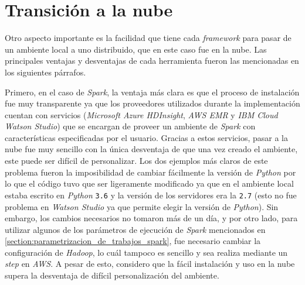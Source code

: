\section{Transición a la nube}

Otro aspecto importante es la facilidad que tiene cada \textit{framework} para pasar de un ambiente local a uno distribuido, que en este caso fue en la nube. Las principales ventajas y desventajas de cada herramienta fueron las mencionadas en los siguientes párrafos.

Primero, en el caso de \textit{Spark}, la ventaja más clara es que el proceso de instalación fue muy transparente ya que los proveedores utilizados durante la implementación cuentan con servicios (\textit{Microsoft Azure HDInsight}, \textit{AWS EMR} y \textit{IBM Cloud Watson Studio}) que se encargan de proveer un ambiente de \textit{Spark} con características especificadas por el usuario. Gracias a estos servicios, pasar a la nube fue muy sencillo con la única desventaja de que una vez creado el ambiente, este puede ser difícil de personalizar. Los dos ejemplos más claros de este problema fueron la imposibilidad de cambiar fácilmente la versión de \textit{Python} por lo que el código tuvo que ser ligeramente modificado ya que en el ambiente local estaba escrito en \textit{Python} \texttt{3.6} y la versión de los servidores era la \texttt{2.7} (esto no fue problema en \textit{Watson Studio} ya que permite elegir la versión de \textit{Python}). Sin embargo, los cambios necesarios no tomaron más de un día, y por otro lado, para utilizar algunos de los parámetros de ejecución de \textit{Spark} mencionados en \ref{section:parametrizacion_de_trabajos_spark}, fue necesario cambiar la configuración de \textit{Hadoop}, lo cuál tampoco es sencillo y sea realiza mediante un \textit{step} en \textit{AWS}. A pesar de esto, considero que la fácil instalación y uso en la nube supera la desventaja de difícil personalización del ambiente.

